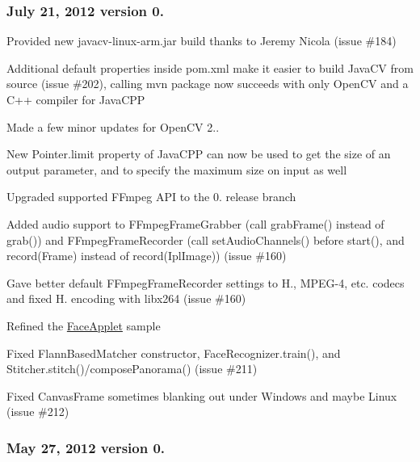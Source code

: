 \subsubsection*{July 21, 2012 version 0.}


\begin{DoxyItemize}
\item Provided new {\ttfamily javacv-\/linux-\/arm.\+jar} build thanks to Jeremy Nicola (issue \#184)
\item Additional default properties inside {\ttfamily pom.\+xml} make it easier to build Java\+C\+V from source (issue \#202), calling {\ttfamily mvn package} now succeeds with only Open\+C\+V and a C++ compiler for Java\+C\+P\+P
\item Made a few minor updates for Open\+C\+V 2..
\item New {\ttfamily Pointer.\+limit} property of Java\+C\+P\+P can now be used to get the {\ttfamily size} of an output parameter, and to specify the maximum {\ttfamily size} on input as well
\item Upgraded supported F\+Fmpeg A\+P\+I to the 0. release branch
\item Added audio support to {\ttfamily F\+Fmpeg\+Frame\+Grabber} (call {\ttfamily grab\+Frame()} instead of {\ttfamily grab()}) and {\ttfamily F\+Fmpeg\+Frame\+Recorder} (call {\ttfamily set\+Audio\+Channels()} before {\ttfamily start()}, and {\ttfamily record(\+Frame)} instead of {\ttfamily record(\+Ipl\+Image)}) (issue \#160)
\item Gave better default {\ttfamily F\+Fmpeg\+Frame\+Recorder} settings to H., M\+P\+E\+G-\/4, etc. codecs and fixed H. encoding with libx264 (issue \#160)
\item Refined the {\ttfamily \hyperlink{class_face_applet}{Face\+Applet}} sample
\item Fixed {\ttfamily Flann\+Based\+Matcher} constructor, {\ttfamily Face\+Recognizer.\+train()}, and {\ttfamily Stitcher.\+stitch()/compose\+Panorama()} (issue \#211)
\item Fixed {\ttfamily Canvas\+Frame} sometimes blanking out under Windows and maybe Linux (issue \#212)
\end{DoxyItemize}

\subsubsection*{May 27, 2012 version 0.}



